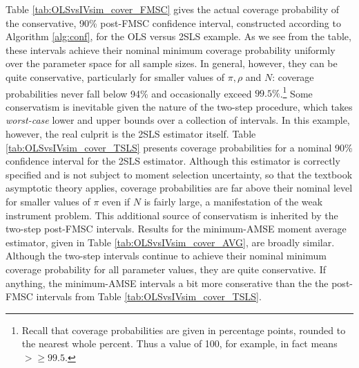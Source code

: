 Table \ref{tab:OLSvsIVsim_cover_FMSC} gives the actual coverage probability of the conservative, 90\% post-FMSC confidence interval, constructed according to Algorithm \ref{alg:conf}, for the OLS versus 2SLS example.
As we see from the table, these intervals achieve their nominal minimum coverage probability uniformly over the parameter space for all sample sizes.
In general, however, they can be quite conservative, particularly for smaller values of $\pi, \rho$ and $N$: coverage probabilities never fall below 94\% and occasionally exceed $99.5\%$.\footnote{Recall that coverage probabilities are given in percentage points, rounded to the nearest whole percent. Thus a value of 100, for example, in fact means $>\geq 99.5$.}
Some conservatism is inevitable given the nature of the two-step procedure, which takes \emph{worst-case} lower and upper bounds over a collection of intervals.
In this example, however, the real culprit is the 2SLS estimator itself.
Table \ref{tab:OLSvsIVsim_cover_TSLS} presents coverage probabilities for a nominal 90\% confidence interval for the 2SLS estimator.
Although this estimator is correctly specified and is not subject to moment selection uncertainty, so that the textbook asymptotic theory applies, coverage probabilities are far above their nominal level for smaller values of $\pi$ even if $N$ is fairly large, a manifestation of the weak instrument problem.
This additional source of conservatism is inherited by the two-step post-FMSC intervals.
Results for the minimum-AMSE moment average estimator, given in Table \ref{tab:OLSvsIVsim_cover_AVG}, are broadly similar.
Although the two-step intervals continue to achieve their nominal minimum coverage probability for all parameter values, they are quite conservative.
If anything, the minimum-AMSE intervals a bit more conserative than the the post-FMSC intervals from Table \ref{tab:OLSvsIVsim_cover_TSLS}.


